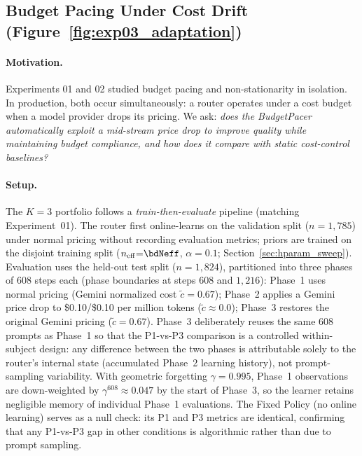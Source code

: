 
\subsection{Budget Pacing Under Cost Drift (Figure~\ref{fig:exp03_adaptation})}
\label{sec:budget_drift}

\paragraph{Motivation.}
Experiments 01 and 02 studied budget pacing and non-stationarity in
isolation.  In production, both occur simultaneously: a router
operates under a cost budget when a model provider drops its pricing.
We ask: \emph{does the BudgetPacer automatically exploit a mid-stream
price drop to improve quality while maintaining budget compliance,
and how does it compare with static cost-control baselines?}

\paragraph{Setup.}
The $K{=}3$ portfolio follows a \emph{train-then-evaluate} pipeline
(matching Experiment~01).
The router first online-learns on the validation split
($n{=}1{,}785$) under normal pricing without recording evaluation
metrics; priors are trained on the disjoint training split
($n_{\mathrm{eff}}{=}\bdNeff$, $\alpha{=}0.1$;
Section~\ref{sec:hparam_sweep}).
Evaluation uses the held-out test split ($n{=}1{,}824$),
partitioned into three phases of $608$ steps each
(phase boundaries at steps $608$ and $1{,}216$):
Phase~1 uses normal pricing (Gemini normalized cost
$\tilde{c}{=}0.67$); Phase~2 applies a Gemini price
drop to \$0.10/\$0.10 per million tokens ($\tilde{c} \approx 0.0$);
Phase~3 restores the original Gemini pricing
($\tilde{c}{=}0.67$).
Phase~3 deliberately reuses the same 608 prompts as Phase~1 so that
the P1-vs-P3 comparison is a controlled within-subject design: any
difference between the two phases is attributable solely to the
router's internal state (accumulated Phase~2 learning history), not
prompt-sampling variability.
With geometric forgetting $\gamma{=}0.995$, Phase~1 observations are
down-weighted by $\gamma^{608}\approx 0.047$ by the start of Phase~3,
so the learner retains negligible memory of individual Phase~1
evaluations.
The Fixed Policy (no online learning) serves as a null check: its P1
and P3 metrics are identical, confirming that any P1-vs-P3 gap in
other conditions is algorithmic rather than due to prompt sampling.

